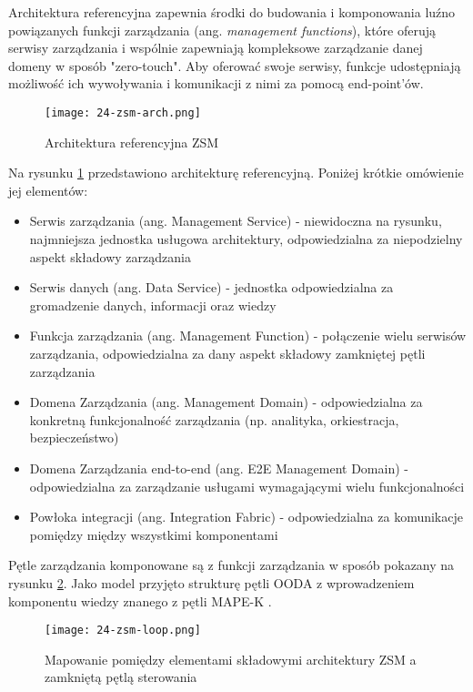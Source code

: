Architektura referencyjna zapewnia środki do budowania i komponowania luźno powiązanych funkcji zarządzania (ang. \textit{management functions}), które oferują serwisy zarządzania i wspólnie zapewniają kompleksowe zarządzanie danej domeny w sposób "zero-touch". Aby oferować swoje serwisy, funkcje udostępniają możliwość ich wywoływania i komunikacji z nimi za pomocą end-point'ów. 

\begin{figure}[!htbp]
    \centering \texttt{[image: 24-zsm-arch.png]}
    \caption{Architektura referencyjna ZSM}\label{fig:24-zsm-arch}
\end{figure}

Na rysunku \ref{fig:24-zsm-arch} przedstawiono architekturę referencyjną. Poniżej krótkie omówienie jej elementów:
\begin{itemize}
    \item Serwis zarządzania (ang. Management Service) - niewidoczna na rysunku, najmniejsza jednostka usługowa architektury, odpowiedzialna za niepodzielny aspekt składowy zarządzania
    \item Serwis danych (ang. Data Service) - jednostka odpowiedzialna za gromadzenie danych, informacji oraz wiedzy
    \item Funkcja zarządzania (ang. Management Function) - połączenie wielu serwisów zarządzania, odpowiedzialna za dany aspekt składowy zamkniętej pętli zarządzania
    \item Domena Zarządzania (ang. Management Domain) - odpowiedzialna za konkretną funkcjonalność zarządzania (np. analityka, orkiestracja, bezpieczeństwo)
    \item Domena Zarządzania end-to-end (ang. E2E Management Domain) - odpowiedzialna za zarządzanie usługami wymagającymi wielu funkcjonalności
    \item Powłoka integracji (ang. Integration Fabric) - odpowiedzialna za komunikacje pomiędzy między wszystkimi komponentami
\end{itemize}

Pętle zarządzania komponowane są z funkcji zarządzania w sposób pokazany na rysunku \ref{fig:24-zsm-loop}. Jako model przyjęto  strukturę pętli OODA \cite{boyd1995} z wprowadzeniem komponentu wiedzy znanego z pętli MAPE-K \cite{kephart2003}. 

\begin{figure}[!htbp]
    \centering \texttt{[image: 24-zsm-loop.png]}
    \caption{Mapowanie pomiędzy elementami składowymi architektury ZSM a zamkniętą pętlą sterowania}\label{fig:24-zsm-loop}
\end{figure}


